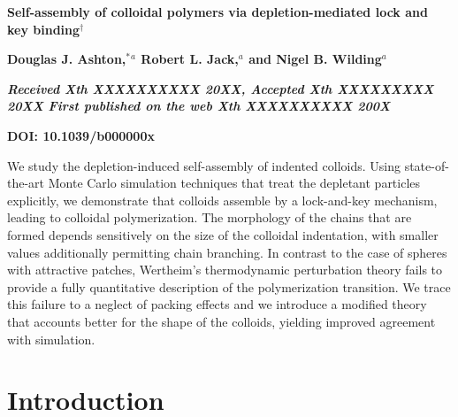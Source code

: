\documentclass[10pt,onside,singlecolumn]{article}
\begin{document}
  \begin{@twocolumnfalse}
\noindent\LARGE{\textbf{Self-assembly of colloidal polymers via depletion-mediated lock and key binding$^\dag$}}
\vspace{0.6cm}

\noindent\large{\textbf{Douglas J. Ashton,$^{\ast}$\textit{$^{a}$} Robert L. Jack,\textit{$^{a}$} and
Nigel B. Wilding\textit{$^{a}$}}}\vspace{0.5cm}

\noindent\textit{\small{\textbf{Received Xth XXXXXXXXXX 20XX, Accepted Xth XXXXXXXXX 20XX\newline
First published on the web Xth XXXXXXXXXX 200X}}}

\noindent \textbf{\small{DOI: 10.1039/b000000x}}
\vspace{0.6cm}

\noindent \normalsize{We study the depletion-induced self-assembly of indented colloids.
Using state-of-the-art Monte Carlo simulation techniques that treat
the depletant particles explicitly, we demonstrate that colloids assemble by a
lock-and-key mechanism, leading to colloidal polymerization. 
The morphology
of the chains that are formed depends sensitively on the size of the
colloidal indentation, with smaller values additionally permitting
chain branching.  In contrast to the case of spheres with attractive
patches, Wertheim's thermodynamic perturbation theory fails to provide a fully
quantitative description of the polymerization transition.  We trace
this failure to a neglect of packing effects and we introduce a modified theory
that accounts better for the shape of the colloids, yielding improved
agreement with simulation.
}

\vspace{0.5cm}
 \end{@twocolumnfalse}
  

\newcommand{\vfs}{\eta_s^r}



\section{Introduction} \label{sec:intro}
\end{document}
